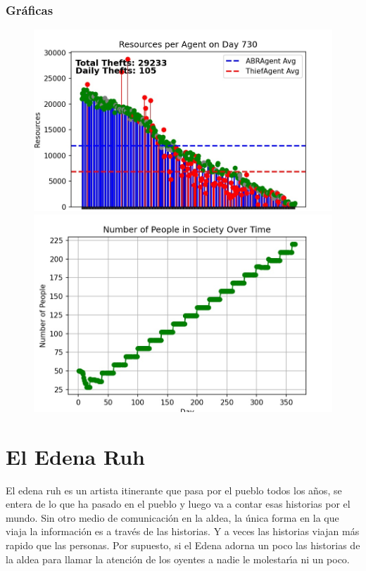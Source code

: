 \documentclass{article}
\begin{document}
\subsubsection{Gr\'aficas}
\begin{figure}[h]
      \centering
      \begin{minipage}{0.42\textwidth}
            \centering
            \includegraphics[width=\textwidth]{agents_2.jpg}
      \end{minipage}\hfill
      \begin{minipage}{0.42\textwidth}
            \centering
            \includegraphics[width=\textwidth]{alive_2.jpg}
      \end{minipage}\hfill
\end{figure}

\newpage

\section{El Edena Ruh}
El edena ruh es un artista itinerante que pasa por el pueblo todos los años, se entera de lo que ha pasado en el pueblo y luego va a contar esas historias por el mundo.
Sin otro medio de comunicaci\'on en la aldea, la \'unica forma en la que viaja la informaci\'on es a trav\'es de las historias. Y a veces las historias viajan m\'as rapido
que las personas. Por supuesto, si el Edena adorna un poco las historias de la aldea para llamar la atenci\'on de los oyentes a nadie le molestar\'{\i}a ni un poco.
\end{document}
